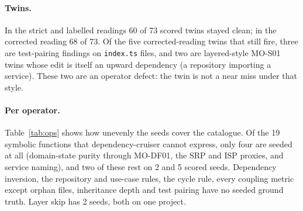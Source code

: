 \documentclass[10pt,a4paper]{article}
\newcommand{\dc}{dependency-cruiser}
\begin{document}
\paragraph{Twins.} In the strict and labelled readings 60 of 73 scored twins stayed clean; in the corrected reading
68 of 73. %
Of the five corrected-reading twins that still fire, three are test-pairing findings on \texttt{index.ts} files, and
two are layered-style MO-S01 twins whose edit is itself an upward dependency (a repository importing a service).
These two are an operator defect: the twin is not a near miss under that style. %

\paragraph{Per operator.}
Table~\ref{tab:ops} shows how unevenly the seeds cover the catalogue. Of the 19 symbolic functions that \dc{}
cannot express, only four are seeded at all (domain-state purity through MO-DF01, the SRP and ISP proxies, and
service naming), and two of these rest on 2 and 5 scored seeds. Dependency inversion, the repository and use-case
rules, the cycle rule, every coupling metric except orphan files, inheritance depth and test pairing have no seeded
ground truth. Layer skip has 2 seeds, both on one project.
\end{document}
